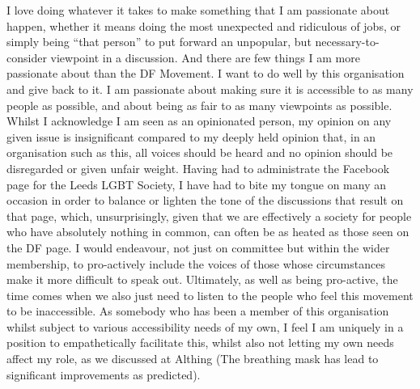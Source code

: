 \documentclass[a4paper, 11pt]{article} %
\begin{document}
\begin{onehalfspacing}
I love doing whatever it takes to make something that I am passionate about happen, whether it means doing the most unexpected and ridiculous of jobs, or simply being “that person” to put forward an unpopular, but necessary-to-consider viewpoint in a discussion. And there are few things I am more passionate about than the DF Movement. I want to do well by this organisation and give back to it. I am passionate about making sure it is accessible to as many people as possible, and about being as fair to as many viewpoints as possible. Whilst I acknowledge I am seen as an opinionated person, my opinion on any given issue is insignificant compared to my deeply held opinion that, in an organisation such as this, all voices should be heard and no opinion should be disregarded or given unfair weight. Having had to administrate the Facebook page for the Leeds LGBT Society, I have had to bite my tongue on many an occasion in order to balance or lighten the tone of the discussions that result on that page, which, unsurprisingly, given that we are effectively a society for people who have absolutely nothing in common, can often be as heated as those seen on the DF page. 
 I would endeavour, not just on committee but within the wider membership, to pro-actively include the voices of those whose circumstances make it more difficult to speak out. Ultimately, as well as being pro-active, the time comes when we also just need to listen to the people who feel this movement to be inaccessible. As somebody who has been a member of this organisation whilst subject to various accessibility needs of my own, I feel I am uniquely in a position to empathetically facilitate this, whilst also not letting my own needs affect my role, as we discussed at Althing (The breathing mask has lead to significant improvements as predicted).


\end{onehalfspacing}
\end{document}
